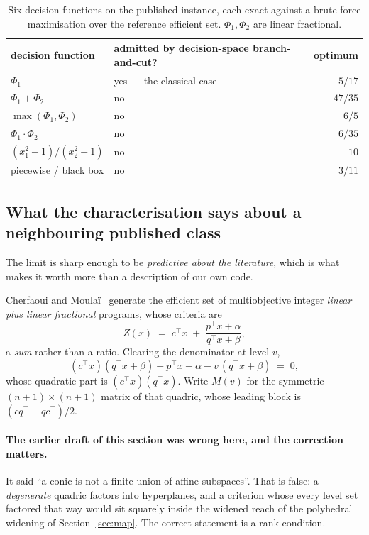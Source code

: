 \documentclass[11pt,a4paper]{article}
\begin{document}
\begin{table}[h]
\centering
\caption{Six decision functions on the published instance, each exact against a
brute-force maximisation over the reference efficient set.  $\Phi_1,\Phi_2$ are
linear fractional.}
\label{tab:admissible}
\begin{tabular}{llr}
\toprule
decision function & admitted by decision-space branch-and-cut? & optimum \\
\midrule
$\Phi_1$                        & yes --- the classical case & $5/17$ \\
$\Phi_1 + \Phi_2$               & no & $47/35$ \\
$\max(\Phi_1,\Phi_2)$           & no & $6/5$ \\
$\Phi_1 \cdot \Phi_2$           & no & $6/35$ \\
$(x_1^2+1)/(x_2^2+1)$           & no & $10$ \\
piecewise / black box           & no & $3/11$ \\
\bottomrule
\end{tabular}
\end{table}

\subsection{What the characterisation says about a neighbouring published class}

The limit is sharp enough to be \emph{predictive about the literature}, which
is what makes it worth more than a description of our own code.

Cherfaoui and Moula\"i~\cite{cherfaoui2021} generate the efficient set of
multiobjective integer
\emph{linear plus linear fractional} programs, whose criteria are
\[
  Z(x) \;=\; c^{\top}x \;+\; \frac{p^{\top}x + \alpha}{q^{\top}x + \beta} ,
\]
a \emph{sum} rather than a ratio.  Clearing the denominator at level $v$,
\[
  (c^{\top}x)(q^{\top}x + \beta) + p^{\top}x + \alpha
     - v\,(q^{\top}x + \beta) \;=\; 0 ,
\]
whose quadratic part is $(c^{\top}x)(q^{\top}x)$.  Write $M(v)$ for the
symmetric $(n+1) \times (n+1)$ matrix of that quadric, whose leading block is
$(c q^{\top} + q c^{\top})/2$.

\paragraph{The earlier draft of this section was wrong here, and the
correction matters.}
It said ``a conic is not a finite union of affine subspaces''.  That is
false: a \emph{degenerate} quadric factors into hyperplanes, and a criterion
whose every level set factored that way would sit squarely inside the
widened reach of the polyhedral widening of Section~\ref{sec:map}.  The correct statement
is a rank condition.
\end{document}
